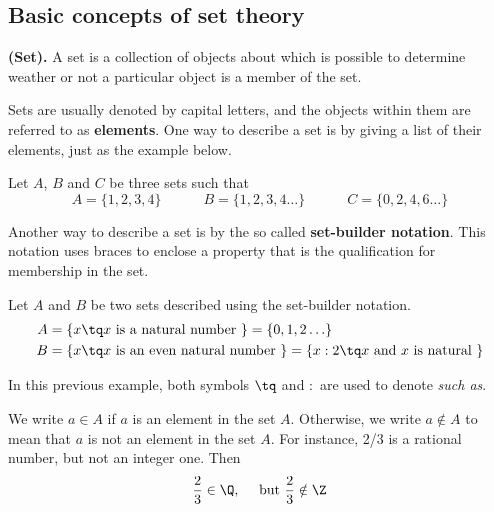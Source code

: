 
\subsection{Basic concepts of set theory}
\begin{definition}
    \textbf{(Set).} A set is a collection of objects about which is possible to determine weather or not a particular object is a member of the set.
\end{definition}

Sets are usually denoted by capital letters, and the objects within them are referred to as \textbf{elements}. One way to describe a set is by giving a list of their elements, just as the example below.
\begin{example}
    Let $A$, $B$ and $C$ be three sets such that
    \begin{equation}
        A = \lbrace 1, 2, 3, 4\rbrace \quad\quad\quad B = \lbrace 1, 2, 3, 4\ldots\rbrace \quad\quad\quad C = \lbrace 0, 2, 4, 6\ldots\rbrace
    \end{equation}
\end{example}

Another way to describe a set is by the so called \textbf{set-builder notation}. This notation uses braces to enclose a property that is the qualification for membership in the set.

\begin{example}
    Let $A$ and $B$ be two sets described using the set-builder notation.
    \begin{align}
        A &= \lbrace x\tq x \textrm{ is a natural number } \rbrace = \lbrace 0, 1, 2\ldots\rbrace \\
        B &= \lbrace x\tq x \textrm{ is an even natural number } \rbrace = \lbrace x : 2\tq x \textrm{ and $x$ is natural } \rbrace
    \end{align}
\end{example}

\begin{notation}
    In this previous example, both symbols $\tq$ and $ : $ are used to denote \textit{such as}.
\end{notation}

We write $a\in A$ if $a$ is an element in the set $A$. Otherwise, we write $a\notin A$ to mean that $a$ is not an element in the set $A$. For instance, 2/3 is a rational number, but not an integer one. Then
\begin{equation}
    \frac{2}{3}\in\Q,\quad\textrm{ but } \frac{2}{3}\notin\Z 
\end{equation}

